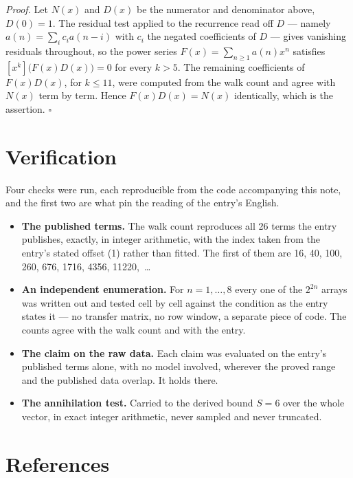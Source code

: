 \documentclass[11pt]{article}
\theoremstyle{definition}
\begin{document}
{\itshape Proof.} Let $N(x)$ and $D(x)$ be the numerator and denominator above, $D(0)=1$. The residual test applied to the recurrence read off $D$ --- namely $a(n) = \sum_i c_i a(n-i)$ with $c_i$ the negated coefficients of $D$ --- gives vanishing residuals throughout, so the power series $F(x)=\sum_{n\ge 1}a(n)x^n$ satisfies $[x^k]\bigl(F(x)D(x)\bigr) = 0$ for every $k > 5$. The remaining coefficients of $F(x)D(x)$, for $k \le 11$, were computed from the walk count and agree with $N(x)$ term by term. Hence $F(x)D(x) = N(x)$ identically, which is the assertion. $\square$

\section{Verification}

Four checks were run, each reproducible from the code accompanying this note, and the first two are what pin the reading of the entry's English.

\begin{itemize}

\item {\bfseries The published terms.} The walk count reproduces all 26 terms the entry publishes, exactly, in integer arithmetic, with the index taken from the entry's stated offset (1) rather than fitted. The first of them are 16, 40, 100, 260, 676, 1716, 4356, 11220,~\dots

\item {\bfseries An independent enumeration.} For $n = 1,\dots,8$ every one of the $2^{2n}$ arrays was written out and tested cell by cell against the condition as the entry states it --- no transfer matrix, no row window, a separate piece of code. The counts agree with the walk count and with the entry.

\item {\bfseries The claim on the raw data.} Each claim was evaluated on the entry's published terms alone, with no model involved, wherever the proved range and the published data overlap. It holds there.

\item {\bfseries The annihilation test.} Carried to the derived bound $S = 6$ over the whole vector, in exact integer arithmetic, never sampled and never truncated.

\end{itemize}

\section{References}
\end{document}
